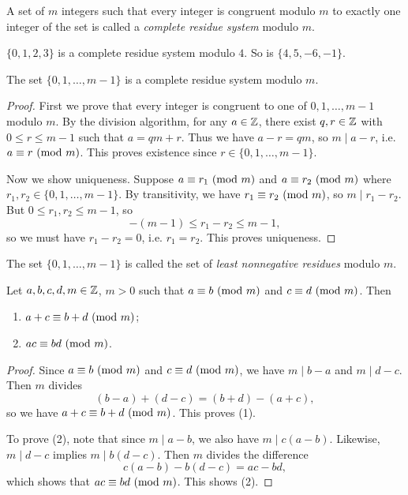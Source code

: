\begin{definition}
  A set of $m$ integers such that every
  integer is congruent modulo $m$ to
  exactly one integer of the set is
  called a \emph{complete residue system}
  modulo $m$.
\end{definition}

\begin{example}
  $\{0, 1, 2, 3\}$ is a complete
  residue system modulo $4$.
  So is $\{4, 5, -6, -1\}$.
\end{example}

\begin{prop}
  The set $\{0, 1, \dots, m - 1\}$
  is a complete residue system
  modulo $m$.
\end{prop}

\begin{proof}
  First we prove that every integer
  is congruent to one of
  $0, 1, \dots, m - 1$ modulo $m$.
  By the division algorithm, for any
  $a \in \mathbb{Z}$, there exist $q, r \in \mathbb{Z}$
  with $0 \le r \le m - 1$ such that
  $a = qm + r$. Thus we have
  $a - r = qm$, so $m \mid a - r$, i.e.
  $a \equiv r \ (\mathrm{mod}\ m)$. This proves
  existence since $r \in \{0, 1, \dots, m - 1\}$.

  Now we show uniqueness. Suppose
  $a \equiv r_1 \ (\mathrm{mod}\ m)$ and
  $a \equiv r_2 \ (\mathrm{mod}\ m)$ where
  $r_1, r_2 \in \{0, 1, \dots, m - 1\}$.
  By transitivity, we have
  $r_1 \equiv r_2 \ (\mathrm{mod}\ m)$, so
  $m \mid r_1 - r_2$. But
  $0 \le r_1, r_2 \le m - 1$, so
  \[
    -(m - 1) \le r_1 - r_2 \le m - 1,
  \]
  so we must have $r_1 - r_2 = 0$, i.e.
  $r_1 = r_2$. This proves uniqueness.
\end{proof}

\begin{definition}
  The set $\{0, 1, \dots, m - 1\}$ is
  called the set of \emph{least nonnegative residues}
  modulo $m$.
\end{definition}

\begin{prop}
  Let $a, b, c, d, m \in \mathbb{Z}$, $m > 0$
  such that $a \equiv b \ (\mathrm{mod}\ m)$
  and $c \equiv d \ (\mathrm{mod}\ m)$. Then
  \begin{enumerate}
    \item $a + c \equiv b + d \ (\mathrm{mod}\ m)$;
    \item $ac \equiv bd \ (\mathrm{mod}\ m)$.
  \end{enumerate}
\end{prop}

\begin{proof}
  Since $a \equiv b \ (\mathrm{mod}\ m)$ and
  $c \equiv d \ (\mathrm{mod}\ m)$, we have
  $m \mid b - a$ and $m \mid d - c$.
  Then $m$ divides
  \[
    (b - a) + (d - c)
    = (b + d) - (a + c),
  \]
  so we have $a + c \equiv b + d \ (\mathrm{mod}\ m)$.
  This proves (1).

  To prove (2), note that
  since $m \mid a - b$, we also have
  $m \mid c(a - b)$. Likewise,
  $m \mid d - c$ implies $m \mid b(d - c)$.
  Then $m$ divides the difference
  \[
    c(a - b) - b(d - c)
    = ac - bd,
  \]
  which shows that $ac \equiv bd \ (\mathrm{mod}\ m)$.
  This shows (2).
\end{proof}

